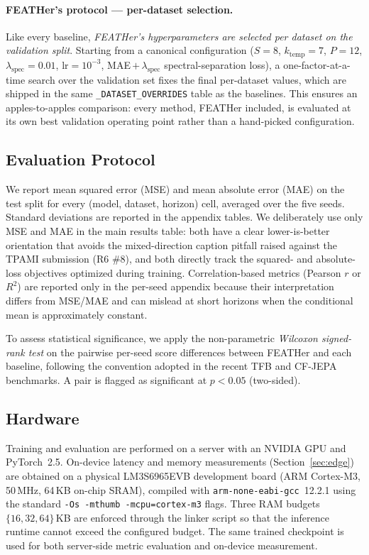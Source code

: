 \documentclass[journal]{IEEEtran}
\theoremstyle{remark}
\begin{document}
\paragraph{FEATHer's protocol --- per-dataset selection.}
Like every baseline, \emph{FEATHer's hyperparameters are selected
per dataset on the validation split}. Starting from a canonical
configuration ($S{=}8$, $k_{\mathrm{temp}}{=}7$, $P{=}12$,
$\lambda_{\mathrm{spec}}{=}0.01$, $\mathrm{lr}{=}10^{-3}$,
MAE\,$+\,\lambda_{\mathrm{spec}}$ spectral-separation loss), a
one-factor-at-a-time search over the validation set fixes the final
per-dataset values, which are shipped in the same
\texttt{\_DATASET\_OVERRIDES} table as the baselines. This ensures
an apples-to-apples comparison: every method, FEATHer included, is
evaluated at its own best validation operating point rather than a
hand-picked configuration.

\subsection{Evaluation Protocol}
\label{subsec:evaluation}
We report mean squared error (MSE) and mean absolute error (MAE) on
the test split for every (model, dataset, horizon) cell, averaged
over the five seeds. Standard deviations are reported in the
appendix tables.
We deliberately use only MSE and MAE in the main results table:
both have a clear lower-is-better orientation that avoids the
mixed-direction caption pitfall raised against the TPAMI submission
(R6 \#8), and both directly track the squared- and absolute-loss
objectives optimized during training. Correlation-based metrics
(Pearson $r$ or $R^{2}$) are reported only in the per-seed appendix
because their interpretation differs from MSE/MAE and can mislead at
short horizons when the conditional mean is approximately constant.

To assess statistical significance, we apply the non-parametric
\emph{Wilcoxon signed-rank test} on the pairwise per-seed score
differences between FEATHer and each baseline, following the
convention adopted in the recent TFB and CF-JEPA benchmarks.
A pair is flagged as significant at $p < 0.05$ (two-sided).

\subsection{Hardware}
\label{subsec:hardware}
Training and evaluation are performed on a server with an NVIDIA
GPU and PyTorch~\mbox{2.5}. On-device latency and memory
measurements (Section~\ref{sec:edge}) are obtained on a physical
LM3S6965EVB development board (ARM Cortex-M3, 50\,MHz,
64\,KB on-chip SRAM), compiled with
\texttt{arm-none-eabi-gcc}~12.2.1 using the standard
\texttt{-Os -mthumb -mcpu=cortex-m3} flags. Three RAM budgets
$\{16, 32, 64\}$\,KB are enforced through the linker script so that
the inference runtime cannot exceed the configured budget. The same
trained checkpoint is used for both server-side metric evaluation
and on-device measurement.
\end{document}
